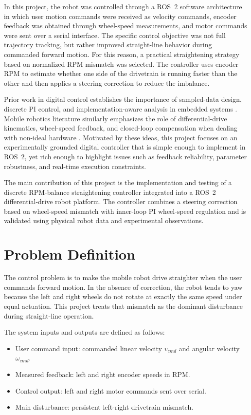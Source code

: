 \documentclass[conference]{IEEEtran}
\begin{document}
In this project, the robot was controlled through a ROS~2 software architecture in which user motion commands were received as velocity commands, encoder feedback was obtained through wheel-speed measurements, and motor commands were sent over a serial interface. The specific control objective was not full trajectory tracking, but rather improved straight-line behavior during commanded forward motion. For this reason, a practical straightening strategy based on normalized RPM mismatch was selected. The controller uses encoder RPM to estimate whether one side of the drivetrain is running faster than the other and then applies a steering correction to reduce the imbalance.

Prior work in digital control establishes the importance of sampled-data design, discrete PI control, and implementation-aware analysis in embedded systems \cite{franklin,powell,astrom}. Mobile robotics literature similarly emphasizes the role of differential-drive kinematics, wheel-speed feedback, and closed-loop compensation when dealing with non-ideal hardware \cite{siegwart,corke,siciliano}. Motivated by these ideas, this project focuses on an experimentally grounded digital controller that is simple enough to implement in ROS~2, yet rich enough to highlight issues such as feedback reliability, parameter robustness, and real-time execution constraints.

The main contribution of this project is the implementation and testing of a discrete RPM-balance straightening controller integrated into a ROS~2 differential-drive robot platform. The controller combines a steering correction based on wheel-speed mismatch with inner-loop PI wheel-speed regulation and is validated using physical robot data and experimental observations.

\section{Problem Definition}
The control problem is to make the mobile robot drive straighter when the user commands forward motion. In the absence of correction, the robot tends to yaw because the left and right wheels do not rotate at exactly the same speed under equal actuation. This project treats that mismatch as the dominant disturbance during straight-line operation.

The system inputs and outputs are defined as follows:
\begin{itemize}
\item User command input: commanded linear velocity $v_{cmd}$ and angular velocity $\omega_{cmd}$.
\item Measured feedback: left and right encoder speeds in RPM.
\item Control output: left and right motor commands sent over serial.
\item Main disturbance: persistent left-right drivetrain mismatch.
\end{itemize}
\end{document}
